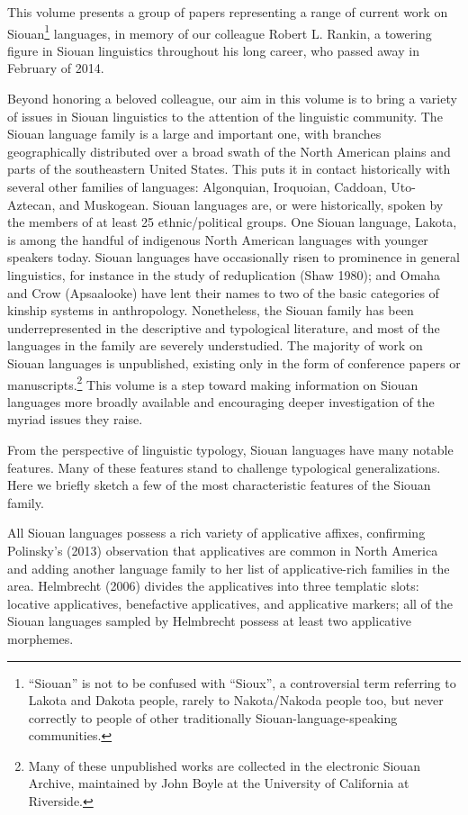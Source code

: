 \begin{refsection}

This volume presents a group of papers representing a range of current work on Siouan\footnote{``Siouan'' is not to be confused with ``Sioux'', a controversial term referring to Lakota and Dakota people, rarely to Nakota/Nakoda people too, but never correctly to people of other traditionally Siouan-language-speaking communities.} languages, in memory of our colleague Robert L. Rankin, a towering figure in Siouan linguistics throughout his long career, who passed away in February of 2014.


Beyond honoring a beloved colleague, our aim in this volume is to bring a variety of issues in Siouan linguistics to the attention of the linguistic community. The Siouan language family is a large and important one, with branches geographically distributed over a broad swath of the North American plains and parts of the southeastern United States. This puts it in contact historically with several other families of languages: Algonquian, Iroquoian, Caddoan, Uto-Aztecan, and Muskogean. Siouan languages are, or were historically, spoken by the members of at least 25 ethnic/political groups. One Siouan language, Lakota, is among the handful of indigenous North American languages with younger speakers today. Siouan languages have occasionally risen to prominence in general linguistics, for instance in the study of reduplication (Shaw 1980); and Omaha and Crow (Apsaalooke) have lent their names to two of the basic categories of kinship systems in anthropology. Nonetheless, the Siouan family has been underrepresented in the descriptive and typological literature, and most of the languages in the family are severely understudied. The majority of work on Siouan languages is unpublished, existing only in the form of conference papers or manuscripts.\footnote{Many of these unpublished works are collected in the electronic Siouan Archive, maintained by John Boyle at the University of California at Riverside.} This volume is a step toward making information on Siouan languages more broadly available and encouraging deeper investigation of the myriad issues they raise.


From the perspective of linguistic typology, Siouan languages have many notable features. Many of these features stand to challenge typological generalizations. Here we briefly sketch a few of the most characteristic features of the Siouan family.


All Siouan languages possess a rich variety of applicative affixes, confirming Polinsky's (2013) observation that applicatives are common in North America and adding another language family to her list of applicative-rich families in the area. Helmbrecht (2006) divides the applicatives into three templatic slots: locative applicatives, benefactive applicatives, and applicative markers; all of the Siouan languages sampled by Helmbrecht possess at least two applicative morphemes.



\end{refsection}
